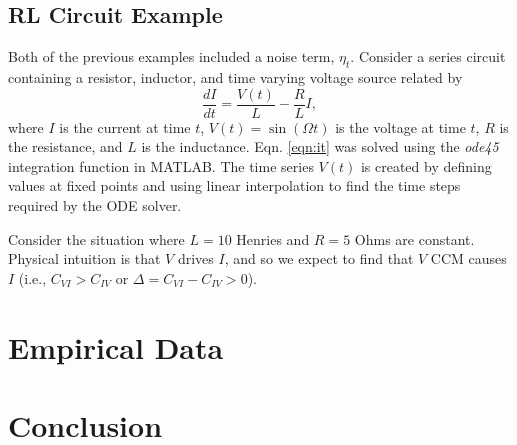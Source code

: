 \documentclass[a4paper,11pt,twocolumn]{article}
\begin{document}
\subsection{RL Circuit Example}
\label{sec:rlcirc}
Both of the previous examples included a noise term, $\eta_t$.  Consider a series circuit containing a resistor, inductor, and time varying voltage source related by
\begin{equation}
\label{eqn:it}
\frac{dI}{dt} = \frac{V(t)}{L} - \frac{R}{L} I,
\end{equation}
where $I$ is the current at time $t$, $V(t)= \sin\left(\Omega t\right)$ is the voltage at time $t$, $R$ is the resistance, and $L$ is the inductance.  Eqn. \ref{eqn:it} was solved using the {\em ode45} integration function in MATLAB.  The time series $V(t)$ is created by defining values at fixed points and using linear interpolation to find the time steps required by the ODE solver.  

Consider the situation where $L=10$ Henries and $R=5$ Ohms are constant.  Physical intuition is that $V$ drives $I$, and so we expect to find that $V$ CCM causes $I$ (i.e., $C_{VI}>C_{IV}$ or $\Delta = C_{VI}-C_{IV} > 0$). 


\section{Empirical Data}

\section{Conclusion}

%
%
\end{document}
